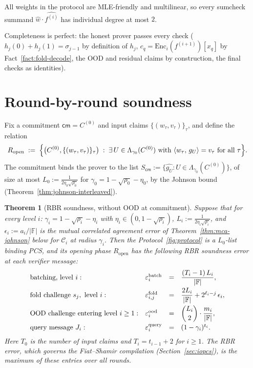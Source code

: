 \documentclass[11pt]{article}
\newcommand{\F}{\mathbb{F}}
\newcommand{\Enc}{\mathrm{Enc}}
\newcommand{\Lam}{\Lambda}
\newcommand{\inner}[2]{\langle #1,\, #2 \rangle}
\newcommand{\pol}[1]{\widehat{#1}}
\theoremstyle{plain}
\newtheorem{theorem}{Theorem}[section]
\theoremstyle{definition}
\theoremstyle{remark}
\begin{document}
All weights in the protocol are MLE-friendly and multilinear, so every sumcheck summand $\pol{w} \cdot \pol{f^{(i)}}$ has individual degree at most $2$.

Completeness is perfect: the honest prover passes every check ($h_j(0) + h_j(1) = \sigma_{j-1}$ by definition of $h_j$, $c_q = \Enc_i(f^{(i+1)})[x_q]$ by Fact~\ref{fact:fold-decode}, the OOD and residual claims by construction, the final checks as identities).

\section{Round-by-round soundness}\label{sec:soundness}

Fix a commitment $\mathsf{cm} = C^{(0)}$ and input claims $\{(w_\tau, v_\tau)\}_\tau$, and define the relation
\[
R_{\mathrm{open}} \;:=\; \Bigl\{ \bigl(C^{(0)}, \{(w_\tau, v_\tau)\}_\tau\bigr) \;:\; \exists\, U \in \Lam_{\gamma_0}(C^{(0)}) \text{ with } \inner{w_\tau}{g_U} = v_\tau \text{ for all } \tau \Bigr\}.
\]
The commitment binds the prover to the list $S_{\mathsf{cm}} := \{\pol{g_U} : U \in \Lam_{\gamma_0}(C^{(0)})\}$, of size at most $L_0 := \tfrac{1}{2\eta_0\sqrt{\rho_0}}$ for $\gamma_0 = 1 - \sqrt{\rho_0} - \eta_0$, by the Johnson bound (Theorem~\ref{thm:johnson-interleaved}).

\begin{theorem}[RBR soundness, without OOD at commitment]\label{thm:rbr}
Suppose that for every level $i$: $\gamma_i = 1 - \sqrt{\rho_i} - \eta_i$ with $\eta_i \in (0, 1-\sqrt{\rho_i})$, $L_i := \tfrac{1}{2\eta_i\sqrt{\rho_i}}$, and $\epsilon_i := a_i/|\F|$ is the mutual correlated agreement error of Theorem~\ref{thm:mca-johnson} below for $\mathcal{C}_i$ at radius $\gamma_i$. Then the Protocol~\ref{fig:protocol} is a $L_0$-list binding PCS, and its opening phase $R_{\mathrm{open}}$ has the following RBR soundness error at each verifier message:
\[
\begin{array}{llcl}
\textnormal{batching, level } i: & \varepsilon^{\mathrm{batch}}_i &=& \dfrac{(T_i - 1)\, L_i}{|\F|} , \\[2ex]
\textnormal{fold challenge } s_j, \textnormal{ level } i: & \varepsilon^{\mathrm{fold}}_{i,j} &=& \dfrac{2 L_i}{|\F|} + 2^{\ell_i - j}\, \epsilon_i , \\[2ex]
\textnormal{OOD challenge entering level } i \ge 1: & \varepsilon^{\mathrm{ood}}_i &=& \dbinom{L_i}{2} \cdot \dfrac{m_i}{|\F|} , \\[2ex]
\textnormal{query message } J_i: & \varepsilon^{\mathrm{query}}_i &=& (1 - \gamma_i)^{t_i} .
\end{array}
\]
Here $T_0$ is the number of input claims and $T_i = t_{i-1} + 2$ for $i \ge 1$. The \emph{RBR error}, which governs the Fiat--Shamir compilation (Section~\ref{sec:iopcs}), is the maximum of these entries over all rounds.
\end{theorem}
\end{document}
